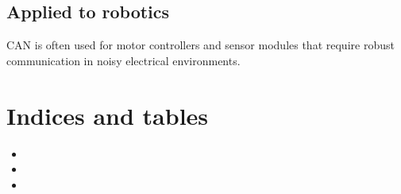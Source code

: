 \documentclass[letterpaper,10pt,english]{sphinxmanual}
\begin{document}
\section{Applied to robotics}
\label{\detokenize{appendix_q_can_bus:applied-to-robotics}}
\sphinxAtStartPar
CAN is often used for motor controllers and sensor modules that require robust
communication in noisy electrical environments.


\chapter{Indices and tables}
\label{\detokenize{index:indices-and-tables}}\begin{itemize}
\item {} 
\sphinxAtStartPar
{}

\item {} 
\sphinxAtStartPar
{}

\item {} 
\sphinxAtStartPar
{}

\end{itemize}



\renewcommand{\indexname}{Index}
\printindex
\end{document}
